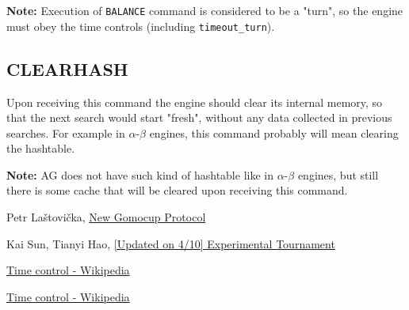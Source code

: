 \documentclass[12pt,a4paper]{article}
\begin{document}
\textbf{Note:} Execution of \texttt{BALANCE} command is considered to be a "turn", so the engine must obey the time controls (including \texttt{timeout{\_}turn}).


\subsection{CLEARHASH}
\label{cmd_clearhash}
Upon receiving this command the engine should clear its internal memory, so that the next search would start "fresh", without any data collected in previous searches. For example in $\alpha$-$\beta$ engines, this command probably will mean clearing the hashtable.

\textbf{Note:} AG does not have such kind of hashtable like in $\alpha$-$\beta$ engines, but still there is some cache that will be cleared upon receiving this command.


\begin{thebibliography}{99}
Petr Laštovička, \href{http://petr.lastovicka.sweb.cz/protocl2en.htm}{New Gomocup Protocol}

Kai Sun, Tianyi Hao, \href{https://gomocup.org/news/experimental-tournament-update-2020/}{[Updated on 4/10] Experimental Tournament}

\href{https://en.wikipedia.org/wiki/Time_control#Increment_and_delay_methods}{Time control - Wikipedia}

\href{https://en.wikipedia.org/wiki/Time_control#Sudden_death}{Time control - Wikipedia}

\end{thebibliography}
\end{document}
